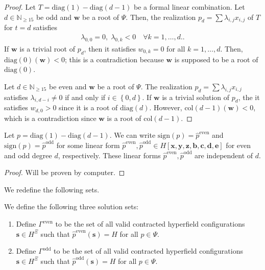 \begin{proof}
    Let \( T = \mathrm{diag}(1) - \mathrm{diag}(d-1) \) be a formal linear combination. Let \( d \in \mathbb{N}_{\geq 15} \) be odd and \( \mathbf{w} \) be a root of \( \Psi \). Then, the realization \( p_d = \sum \lambda_{i,j}x_{i,j}\) of \( T \) for \( t = d \) satisfies 
    \begin{align*}
        \lambda_{0,0} = 0, \;  \lambda_{0,k} < {0} \quad \forall k = 1, \dots, d..
    \end{align*}
     If \( \mathbf{w} \) is a trivial root of \( p_d \), then it satisfies \( w_{0,k} = 0 \) for all \( k = 1, \dots, d \). Then, \( \mathrm{diag}(0)(\mathbf{w}) < 0 \); this is a contradiction because \( \mathbf{w} \) is supposed to be a root of \( \mathrm{diag}(0) \).
    
    Let \( d \in \mathbb{N}_{\geq 15} \) be even and \( \mathbf{w} \) be a root of \( \Psi \). The realization \( p_d = \sum \lambda_{i,j}x_{i,j} \) satisfies \( \lambda_{i,d-i} \neq 0 \) if and only if \( i \in \left\{ 0, d \right\} \). If \( \mathbf{w} \) is a trivial solution of \( p_d \), the it satisfies \( w_{d,0} > 0 \) since it is a root of \( \mathrm{diag}(d) \). However, \( \mathrm{col}(d-1)(\mathbf{w}) < 0 \), which is a contradiction since \( \mathbf{w} \) is a root of \( \mathrm{col}(d-1) \).
\end{proof}

\begin{proposition}
    Let \( p = \mathrm{diag}(1) - \mathrm{diag}(d-1)\). We can write \( \mathrm{sign}(p) = \hat p^{\mathrm{even}} \) and  \( \mathrm{sign}(p) = \hat p^{\mathrm{odd}} \) for some linear form \( \hat p^{\mathrm{even}}, \hat p^{\mathrm{odd}} \in H[\mathbf{x}, \mathbf{y}, \mathbf{z}, \mathbf{b}, \mathbf{c}, \mathbf{d}, \mathbf{e}] \) for even and odd degree \( d \), respectively. These linear forms \(  \hat p^{\mathrm{even}}, \hat p^{\mathrm{odd}} \) are independent of \( d \).
\end{proposition}

\begin{proof}
    Will be proven by computer.
\end{proof}

We redefine the following sets.

\begin{definition}
    We define the following three solution sets:
    \begin{enumerate}
        \item     Define \( \Gamma^{\mathrm{even}} \) to be the set of all valid contracted hyperfield configurations \( \mathbf{s} \in H^{\Xi} \) such that \( \hat p^{\mathrm{even}}(\mathbf{s}) = H \) for all \( p \in \Psi \).

        \item     Define \( \Gamma^{\mathrm{odd}} \) to be the set of all valid contracted hyperfield configurations \( \mathbf{s} \in H^{\Xi} \) such that \( \hat p^{\mathrm{odd}}(\mathbf{s}) = H \) for all \( p \in \Psi \).
    \end{enumerate}
\end{definition}

